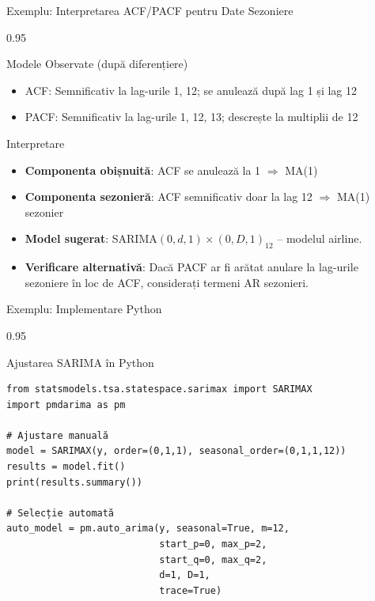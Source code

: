 \documentclass[9pt, aspectratio=169, t]{beamer}
\begin{document}
\begin{frame}{Exemplu: Interpretarea ACF/PACF pentru Date Sezoniere}
    \begin{cminipage}{0.95\textwidth}
    \begin{block}{Modele Observate (după diferențiere)}
        \begin{itemize}\setlength{\itemsep}{0pt}
            \item ACF: Semnificativ la lag-urile 1, 12; se anulează după lag 1 și lag 12
            \item PACF: Semnificativ la lag-urile 1, 12, 13; descrește la multiplii de 12
        \end{itemize}
    \end{block}

    \vspace{0.2cm}

    \begin{exampleblock}{Interpretare}
        \begin{itemize}\setlength{\itemsep}{0pt}
        \item \textbf{Componenta obișnuită}: ACF se anulează la 1 $\Rightarrow$ MA(1)
        \item \textbf{Componenta sezonieră}: ACF semnificativ doar la lag 12 $\Rightarrow$ MA(1) sezonier
        \item \textbf{Model sugerat}: SARIMA$(0,d,1) \times (0,D,1)_{12}$ -- modelul airline.
        \item \textbf{Verificare alternativă}: Dacă PACF ar fi arătat anulare la lag-urile sezoniere în loc de ACF, considerați termeni AR sezonieri.
        \end{itemize}
    \end{exampleblock}
    \end{cminipage}
\end{frame}

\begin{frame}[fragile]{Exemplu: Implementare Python}
    \begin{cminipage}{0.95\textwidth}
    \begin{block}{Ajustarea SARIMA în Python}
        \small
        \begin{verbatim}
from statsmodels.tsa.statespace.sarimax import SARIMAX
import pmdarima as pm

# Ajustare manuală
model = SARIMAX(y, order=(0,1,1), seasonal_order=(0,1,1,12))
results = model.fit()
print(results.summary())

# Selecție automată
auto_model = pm.auto_arima(y, seasonal=True, m=12,
                           start_p=0, max_p=2,
                           start_q=0, max_q=2,
                           d=1, D=1,
                           trace=True)
        \end{verbatim}
    \end{block}
    \end{cminipage}
\end{frame}
\end{document}
